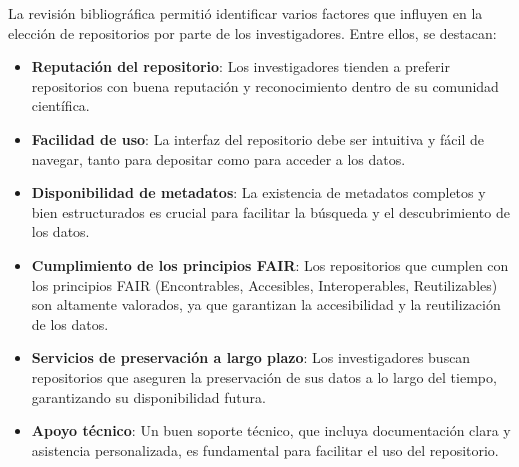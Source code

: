 \documentclass[runningheads]{llncs}
\begin{document}
La revisión bibliográfica permitió identificar varios factores que influyen en la elección de repositorios por parte de los investigadores. Entre ellos, se destacan:
\begin{itemize}
    \item \textbf{Reputación del repositorio}: Los investigadores tienden a preferir repositorios con buena reputación y reconocimiento dentro de su comunidad científica.
    \item \textbf{Facilidad de uso}: La interfaz del repositorio debe ser intuitiva y fácil de navegar, tanto para depositar como para acceder a los datos.
    \item \textbf{Disponibilidad de metadatos}: La existencia de metadatos completos y bien estructurados es crucial para facilitar la búsqueda y el descubrimiento de los datos.
    \item \textbf{Cumplimiento de los principios FAIR}: Los repositorios que cumplen con los principios FAIR (Encontrables, Accesibles, Interoperables, Reutilizables) son altamente valorados, ya que garantizan la accesibilidad y la reutilización de los datos.
    \item \textbf{Servicios de preservación a largo plazo}: Los investigadores buscan repositorios que aseguren la preservación de sus datos a lo largo del tiempo, garantizando su disponibilidad futura.
    \item \textbf{Apoyo técnico}: Un buen soporte técnico, que incluya documentación clara y asistencia personalizada, es fundamental para facilitar el uso del repositorio.
\end{itemize}
\end{document}
